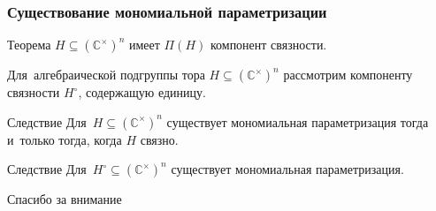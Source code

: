 \documentclass{beamer}
\begin{document}
\begin{frame}
  \frametitle{Существование мономиальной параметризации}

  \begin{block}{Теорема}
    $H \subseteq (\mathbb{C}^\times)^n$ имеет $\Pi(H)$ компонент связности.
  \end{block}

  Для~алгебраической подгруппы тора $H \subseteq (\mathbb{C}^\times)^n$ рассмотрим компоненту
  связности $H^\circ$, содержащую единицу.

  \begin{block}{Следствие}
    Для~$H \subseteq (\mathbb{C}^\times)^n$ существует мономиальная параметризация
    тогда и~только тогда, когда $H$ связно.
  \end{block}

  \begin{block}{Следствие}
    Для~$H^\circ \subseteq (\mathbb{C}^\times)^n$ существует мономиальная параметризация.
  \end{block}
\end{frame}

\begin{frame}
  \centering \Huge{Спасибо за внимание}
\end{frame}
\end{document}
